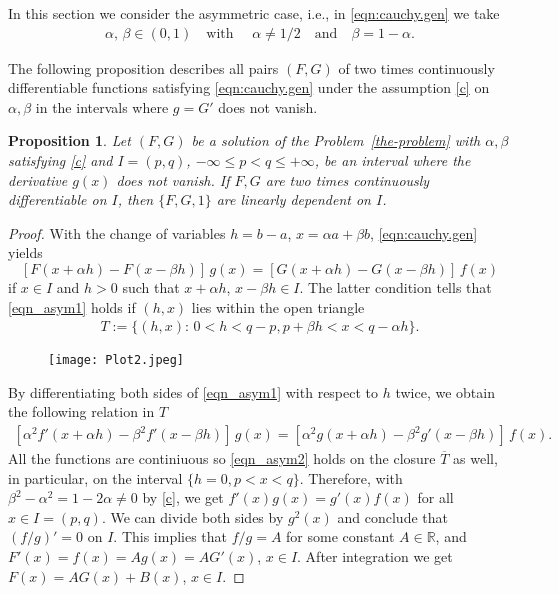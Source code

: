 \documentclass{birkjour}
\newtheorem{proposition}[theorem]{Proposition}
\begin{document}
In this section we consider the asymmetric case, i.e., in \eqref{eqn:cauchy.gen} 
we take 
\begin{align}\label{c}
\alpha, \, \beta \in (0,1) \quad \text{with } \quad \alpha\neq 1/2 \quad \text{and} \quad \beta=1-\alpha. 
\end{align}

The following proposition describes all pairs $(F,G)$ of two times continuously differentiable functions satisfying \eqref{eqn:cauchy.gen} under the assumption \eqref{c} on $\alpha,\beta$ in the intervals where $g=G'$ does not vanish.

\begin{proposition}
\label{cauchy1}
Let $(F,G)$ be a solution of the Problem~\ref{the-problem} with $\alpha,\beta$ satisfying \eqref{c} and $I=(p,q)$, $-\infty\leq p<q \leq +\infty$, be an interval where the derivative $g(x)$ does not vanish. If $F,G$ are two times continuously differentiable on $I$, then $\{F, G, 1\}$ are linearly dependent on $I$.
\end{proposition} 
\begin{proof}
With the change of variables $h=b-a$, $x=\alpha a+\beta b$, \eqref{eqn:cauchy.gen} yields
\begin{equation}\label{eqn_asym1}
[F(x+\alpha h)-F(x-\beta h)]\, g(x) = [G(x+\alpha h)-G(x-\beta h)]\, f(x)
\end{equation}
if $x\in I$ and $h>0$ such that $x+\alpha h$, $x-\beta h\in I$. The latter condition tells that \eqref{eqn_asym1} holds if $(h,x)$ lies within the open triangle 
\begin{align}\label{triangleT}
T := \bigl\{(h,x): \,0<h<q-p, p+\beta h<x<q-\alpha h \bigr\}.
\end{align}

\begin{figure}[h!]
  \caption{}
  \centering
    \texttt{[image: Plot2.jpeg]}
\end{figure}

By differentiating both sides of \eqref{eqn_asym1} with respect to $h$ twice, we obtain the following relation in $T$
\begin{align}\label{eqn_asym2}
[\alpha^2 f'(x+\alpha h) - \beta^2 f'(x-\beta h)]\,g(x)= [\alpha^2 g(x+\alpha h)-\beta^2 g'(x-\beta h)]\,f(x).
\end{align}
All the functions are continiuous so \eqref{eqn_asym2} holds on the closure $\overline{T}$ as well, in particular, on the interval $\{h=0, p<x<q\}$. Therefore, with $\beta^2-\alpha^2=1-2\alpha\neq 0$ by \eqref{c}, we get $f'(x)g(x)=g'(x)f(x)$ for all $x\in I=(p,q)$. We can divide both sides by $g^2(x)$ and conclude that $(f/g)'=0$ on $I$. This implies that $f/g = A$ for some constant $A\in {{\mathbb R}}$, and $F'(x)=f(x)=Ag(x)=AG'(x)$, $x\in I$. After integration we get $F(x)=AG(x)+B(x)$, $x\in I$.
\end{proof}
\end{document}
